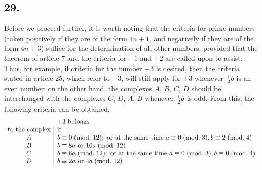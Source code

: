 \documentclass[twoside,12pt]{memoir}
\renewcommand{\pmod}[1]{\;(\textrm{mod.}\;#1)}
\let\oldfrac\frac
\def\frac#1#2{\mathchoice{\tfrac{#1}{#2}}{\oldfrac{#1}{#2}}{\genfrac{}{}{}{2}{#1}{#2\mathstrut}}{\genfrac{}{}{}{3}{#1}{#2\mathstrut}}}
\begin{document}
\subsection*{29.}
Before we proceed further, it is worth noting that the criteria for prime numbers (taken positively if they are of the form \(4n+1\), and negatively if they are of the form \(4n+3\)) suffice for the determination of all other numbers, provided that the theorem of article 7 and the criteria for \(-1\) and \(\pm 2\) are called upon to assist. Thus, for example, if criteria for the number \(+3\) is desired, then the criteria stated in article 25, which refer to \(-3\), will still apply for \(+3\) whenever \(\frac{1}{2}b\) is an even number; on the other hand, the complexes \(A\), \(B\), \(C\), \(D\) should be interchanged with the complexes \(C\), \(D\), \(A\), \(B\) whenever \(\frac{1}{2}b\) is odd. From this, the following criteria can be obtained:\pagebreak%
\[\begin{array}{c|l}
\multicolumn{1}{c}{}&\multicolumn{1}{l}{+3\text{ belongs}}\\
\text{to the complex}&\text{if}\\
A & b \equiv 0\pmod{12}; \text{ or at the same time } a \equiv 0\pmod{3}, b \equiv 2\pmod{4} \\
B & b \equiv 8 a \text{ or } 10 a\pmod{12} \\
C & b \equiv 6 a\pmod{12}; \text{ or at the same time } a \equiv 0\pmod{3}, b \equiv 0\pmod{4} \\
D & b \equiv 2 a \text{ or } 4 a\pmod{12}
\end{array}\]
\end{document}
